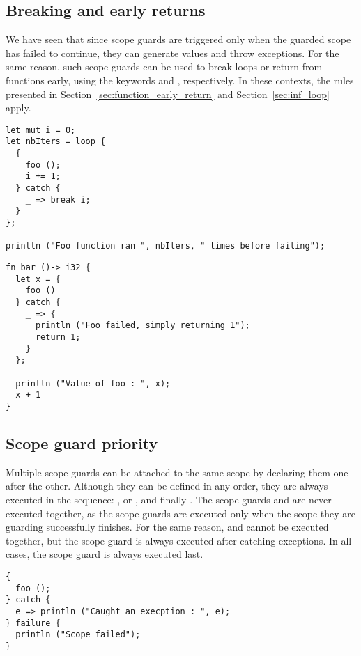 \subsection{Breaking and early returns}

We have seen that since  scope guards are triggered only when the
guarded scope has failed to continue, they can generate values and throw
exceptions. For the same reason, such scope guards can be used to break loops or
return from functions early, using the keywords  and
, respectively. In these contexts, the rules presented in
Section~\ref{sec:function_early_return} and Section~\ref{sec:inf_loop} apply.

\begin{lstlisting}[style=coloredverbatim]
let mut i = 0;
let nbIters = loop {
  {
    foo ();
    i += 1;
  } catch {
    _ => break i;
  }
};

println ("Foo function ran ", nbIters, " times before failing");
\end{lstlisting}

\begin{lstlisting}[style=coloredverbatim]
fn bar ()-> i32 {
  let x = {
    foo ()
  } catch {
    _ => {
      println ("Foo failed, simply returning 1");
      return 1;
    }
  };

  println ("Value of foo : ", x);
  x + 1
}
\end{lstlisting}

\subsection{Scope guard priority}

Multiple scope guards can be attached to the same scope by declaring them one
after the other. Although they can be defined in any order, they are always
executed in the sequence: ,  or , and
finally . The scope guards  and  are
never executed together, as the  scope guards are executed only
when the scope they are guarding successfully finishes. For the same reason,
 and  cannot be executed together, but the
 scope guard is always executed after catching exceptions. In all
cases, the  scope guard is always executed last.

\begin{lstlisting}[style=coloredverbatim]
{
  foo ();
} catch {
  e => println ("Caught an execption : ", e);
} failure {
  println ("Scope failed");
}
\end{lstlisting}

